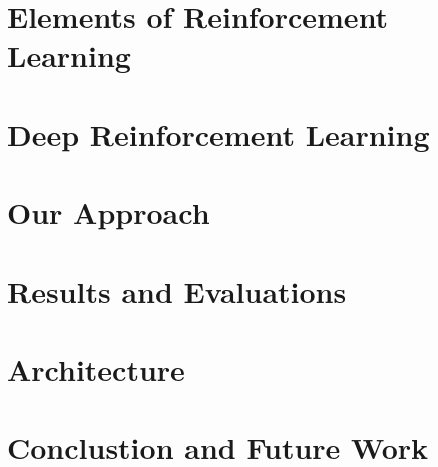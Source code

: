 \documentclass[12pt,twoside]{report}
\begin{document}
\chapter{Elements of Reinforcement Learning} \label{reinforcement-learning}


\chapter{Deep Reinforcement Learning} \label{deep-reinforcement-learning}


\chapter{Our Approach}


\chapter{Results and Evaluations}


\chapter{Architecture}


\chapter{Conclustion and Future Work}



\end{document}
